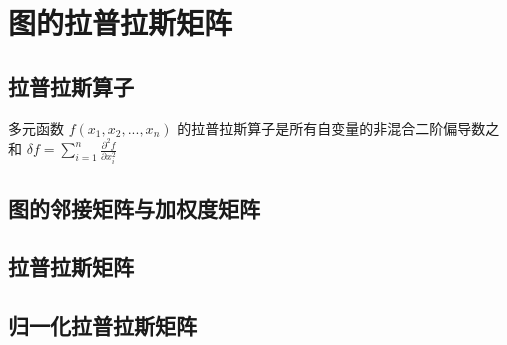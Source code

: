\documentclass[11pt]{article}
\author{Dell7591}
\date{\today}
\title{}
\begin{document}
\tableofcontents

\section{图的拉普拉斯矩阵}
\subsection{拉普拉斯算子}
多元函数 \(f(x_{1},x_{2},...,x_{n})\) 的拉普拉斯算子是所有自变量的非混合二阶偏导数之和 \(\delta f= \sum_{i=1}^{n} \frac{\partial^{2}f}{\partial x_{i}^{2}}\) 
\subsection{图的邻接矩阵与加权度矩阵}
\subsection{拉普拉斯矩阵}
\subsection{归一化拉普拉斯矩阵}
\end{document}
